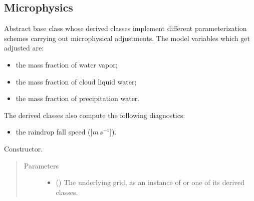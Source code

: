 \documentclass[letterpaper,10pt,english]{sphinxmanual}
\begin{document}
\subsection{Microphysics}
\label{\detokenize{api:microphysics}}

\begin{fulllineitems}
\label{\detokenize{api:tasmania.parameterizations.adjustments.AdjustmentMicrophysics}}
Abstract base class whose derived classes implement different parameterization schemes carrying out
microphysical adjustments. The model variables which get adjusted are:
\begin{itemize}
\item {} 
the mass fraction of water vapor;

\item {} 
the mass fraction of cloud liquid water;

\item {} 
the mass fraction of precipitation water.

\end{itemize}

The derived classes also compute the following diagnostics:
\begin{itemize}
\item {} 
the raindrop fall speed ({[}\(m \, s^{-1}\){]}).

\end{itemize}

\begin{fulllineitems}
\label{\detokenize{api:tasmania.parameterizations.adjustments.AdjustmentMicrophysics.__init__}}
Constructor.
\begin{quote}\begin{description}
\item[{Parameters}] \leavevmode\begin{itemize}
\item {} 
 () \textendash{} The underlying grid, as an instance of {\hyperref[\detokenize{api:tasmania.grids.grid_xyz.GridXYZ}]{}} or one of its derived classes.


\end{itemize}
\end{description}
\end{quote}
\end{fulllineitems}
\end{fulllineitems}
\end{document}
